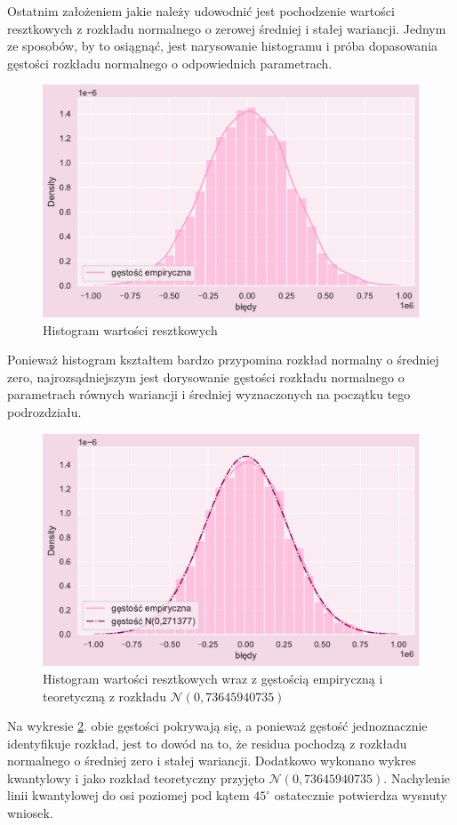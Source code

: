 \documentclass{article}
\begin{document}
Ostatnim założeniem jakie należy udowodnić jest pochodzenie wartości resztkowych z rozkładu normalnego o zerowej średniej i stałej wariancji. Jednym ze sposobów, by to osiągnąć, jest narysowanie histogramu i próba dopasowania gęstości rozkładu normalnego o odpowiednich parametrach. 
    \begin{figure}[H]
	\begin{center}
		\includegraphics[scale=0.68]{images/resi_hist.pdf}
		\caption{Histogram wartości resztkowych}
		\label{denistyx}
	\end{center}
    \end{figure}
\noindent Ponieważ histogram kształtem bardzo przypomina rozkład normalny o średniej zero, najrozsądniejszym jest dorysowanie gęstości rozkładu normalnego o parametrach równych wariancji i średniej wyznaczonych na początku tego podrozdziału.
    \begin{figure}[H]
	\begin{center}
		\includegraphics[scale=0.68]{images/resi_hist_teor.pdf}
		\caption{Histogram wartości resztkowych wraz z gęstością empiryczną i teoretyczną z rozkładu  $\mathcal{N}$$(0,73645940735)$ }
		\label{resi_hist_teor}
	\end{center}
    \end{figure}
\noindent Na wykresie \ref{resi_hist_teor}. obie gęstości pokrywają się, a ponieważ gęstość jednoznacznie identyfikuje rozkład, jest to dowód na to, że residua pochodzą z rozkładu normalnego o średniej zero i stałej wariancji. Dodatkowo wykonano wykres kwantylowy i jako rozkład teoretyczny przyjęto $\mathcal{N}$$(0,73645940735)$. Nachylenie linii kwantylowej do osi poziomej pod kątem $45^\circ$ ostatecznie potwierdza wysnuty wniosek.
\end{document}
